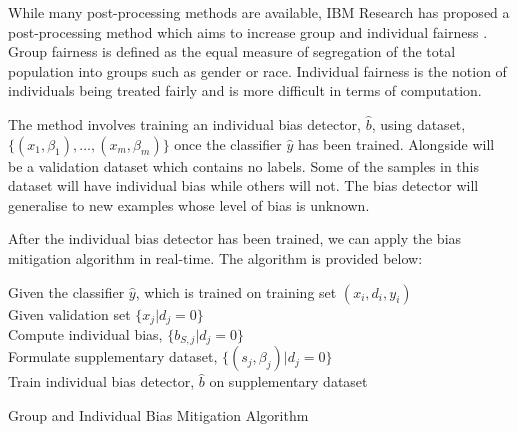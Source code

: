 While many post-processing methods are available, IBM Research has proposed a post-processing method which aims to increase group and individual fairness \cite{lohia2018bias}.
Group fairness is defined as the equal measure of segregation of the total population into groups such as gender or race. 
Individual fairness is the notion of individuals being treated fairly and is more difficult in terms of computation.

The method involves training an individual bias detector, $\hat{b}$, using dataset, \\ 
$\{(x_1,\beta_1), ..., (x_m,\beta_m)\}$ once the classifier $\hat{y}$ has been trained.
Alongside will be a validation dataset which contains no labels.
Some of the samples in this dataset will have individual bias while others will not.
The bias detector will generalise to new examples whose level of bias is unknown.

After the individual bias detector has been trained, we can apply the bias mitigation algorithm \cite{lohia2018bias} in real-time. 
The algorithm is provided below:  


\begin{algorithm}[H]
    \SetAlgoLined
    Given the classifier $\hat{y}$, which is trained on training set ${(x_i, d_i, y_i)}$ \\
    Given validation set $\{x_j | d_j = 0\}$\\
    Compute individual bias, $\{b_{S,j}|d_j=0\}$\\
    Formulate supplementary dataset, $\{(s_j,\beta_j)|d_j = 0 \}$\\
    Train individual bias detector, $\hat{b}$ on supplementary dataset\\
    \caption{Group and Individual Bias Mitigation Algorithm \cite{lohia2018bias}}
\end{algorithm}

